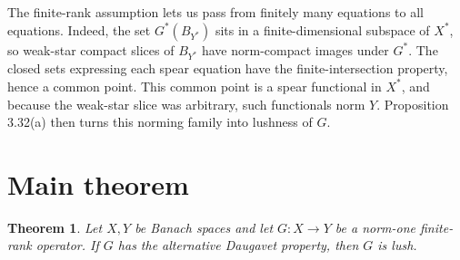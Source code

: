 \documentclass[11pt]{article}
\newtheorem{theorem}{Theorem}
\begin{document}
The finite-rank assumption lets us pass from finitely many equations to all
equations.  Indeed, the set \(G^*(B_{Y^*})\) sits in a finite-dimensional
subspace of \(X^*\), so weak-star compact slices of \(B_{Y^*}\) have
norm-compact images under \(G^*\).  The closed sets expressing each spear
equation have the finite-intersection property, hence a common point.  This
common point is a spear functional in \(X^*\), and because the weak-star
slice was arbitrary, such functionals norm \(Y\).  Proposition 3.32(a) then
turns this norming family into lushness of \(G\).

\section*{Main theorem}

\begin{theorem}
Let \(X,Y\) be Banach spaces and let \(G:X\to Y\) be a norm-one
finite-rank operator.  If \(G\) has the alternative Daugavet property, then
\(G\) is lush.
\end{theorem}
\end{document}
